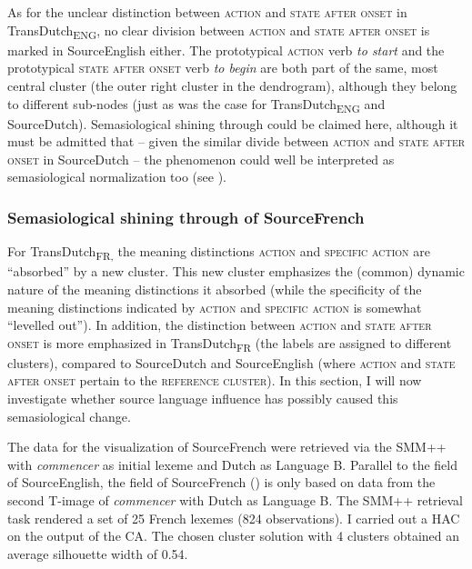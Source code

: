 As for the unclear distinction between \textsc{action} and \textsc{state after onset} in TransDutch\textsubscript{ENG}, no clear division between \textsc{action} and \textsc{state after onset} is marked in SourceEnglish either. The prototypical \textsc{action} verb \textit{to start} and the prototypical \textsc{state after onset} verb \textit{to begin} are both part of the same, most central cluster (the outer right cluster in the dendrogram), although they belong to different sub-nodes (just as was the case for TransDutch\textsubscript{ENG} and SourceDutch). Semasiological shining through could be claimed here, although it must be admitted that -- given the similar divide between \textsc{action} and \textsc{state after onset} in SourceDutch – the phenomenon could well be interpreted as semasiological normalization too (see ).

\subsubsection{Semasiological shining through of SourceFrench}
\label{sec:4.6.1.2}  
For TransDutch\textsubscript{FR,} the meaning distinctions \textsc{action} and {\textsc{specific}} \textsc{action} are ``absorbed'' by a new cluster. This new cluster emphasizes the (common) dynamic nature of the meaning distinctions it absorbed (while the specificity of the meaning distinctions indicated by \textsc{action} and {\textsc{specific}} \textsc{action} is somewhat ``levelled out''). In addition, the distinction between \textsc{action} and \textsc{state after onset} is more emphasized in TransDutch\textsubscript{FR} (the labels are assigned to different clusters), compared to SourceDutch and SourceEnglish (where \textsc{action} and \textsc{state after onset} pertain to the \textsc{reference cluster}). In this section, I will now investigate whether source language influence has possibly caused this semasiological change.

The data for the visualization of SourceFrench were retrieved via the SMM++ with \textit{commencer} as initial lexeme and Dutch as Language B. Parallel to the field of SourceEnglish, the field of SourceFrench () is only based on data from the second T-image of \textit{commencer} with Dutch as Language B. The SMM++ retrieval task rendered a set of 25 French lexemes (824 observations). I carried out a HAC on the output of the CA. The chosen cluster solution with 4 clusters obtained an average silhouette width of 0.54.

